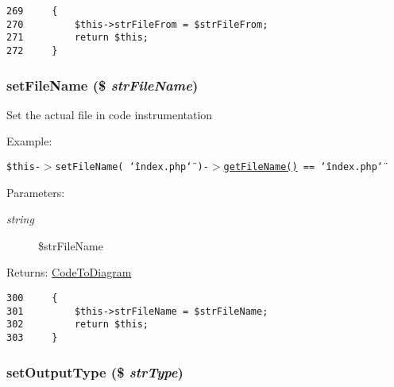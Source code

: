 \begin{Code}\begin{verbatim}269     {
270         $this->strFileFrom = $strFileFrom;
271         return $this;
272     }
\end{verbatim}
\end{Code}


\hypertarget{class_code_to_diagram_14fd91733dbcc57d74df9c22e0c84e72}{
\subsubsection[{setFileName}]{\setlength{\rightskip}{0pt plus 5cm}setFileName (\$ {\em strFileName})}}
\label{class_code_to_diagram_14fd91733dbcc57d74df9c22e0c84e72}


Set the actual file in code instrumentation

\begin{Desc}
\item[Example:]\end{Desc}
{\tt  \$this-$>$setFileName( \char`\"{}index.php\char`\"{} )-$>$\hyperlink{class_code_to_diagram_fdeebfe3fcf5806fc79c074a6a3a6eb1}{getFileName()} == \char`\"{}index.php\char`\"{} } \begin{Desc}
\item[Parameters:]
\begin{description}
\item[{\em string}]\$strFileName \end{description}
\end{Desc}
\begin{Desc}
\item[Returns:]\hyperlink{class_code_to_diagram}{CodeToDiagram} \end{Desc}


\begin{Code}\begin{verbatim}300     {
301         $this->strFileName = $strFileName;
302         return $this;
303     }
\end{verbatim}
\end{Code}


\hypertarget{class_code_to_diagram_b16859ecf5ce7dead56b77cbef45c8bd}{
\subsubsection[{setOutputType}]{\setlength{\rightskip}{0pt plus 5cm}setOutputType (\$ {\em strType})}}
\label{class_code_to_diagram_b16859ecf5ce7dead56b77cbef45c8bd}


